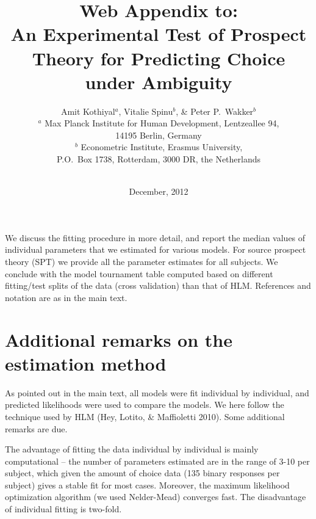 \documentclass[11pt, a4paper, oneside,final,notitlepage,onecolumn]{article}\usepackage[]{graphicx}\usepackage[]{color}
\newcounter{sectio}
\begin{document}
\title{\vspace{-1\baselineskip}\textbf{Web Appendix to:\\
 An Experimental Test of Prospect Theory for Predicting Choice under Ambiguity\vspace{0\baselineskip}}}
\author{Amit Kothiyal$^a$, Vitalie Spinu$^b$, \& Peter P.\ Wakker$^b$\\
  $^a$ Max Planck Institute for Human Development,
  Lentzeallee 94,\\ 14195 Berlin, Germany\\
  $^b$ Econometric Institute, Erasmus University,
  \\P.O.\ Box 1738, Rotterdam, 3000 DR, the Netherlands\\~}

 \date{\vspace{0\baselineskip}December, 2012}
\maketitle

We discuss the fitting procedure in more detail, and report the median values of individual parameters that we estimated for various models. For source prospect theory (SPT) we provide all the parameter estimates for all subjects. We conclude with the model tournament table computed based on different fitting/test splits of the data (cross validation) than that of HLM.  References and notation are as in the main text.




\section{Additional remarks on the estimation method}
\label{sec:design}

As pointed out in the main text, all models were fit individual by individual, and predicted likelihoods were used to compare the models. We here follow the technique used by HLM (Hey, Lotito, \& Maffioletti 2010). Some additional remarks are due. 

The advantage of fitting the data individual by individual is mainly computational -- the number of parameters estimated are in the range of 3-10 per subject, which given the amount of choice data (135 binary responses per subject) gives a stable fit for most cases. Moreover, the maximum likelihood optimization algorithm (we used Nelder-Mead) converges fast. The disadvantage of individual fitting is two-fold.
\end{document}
